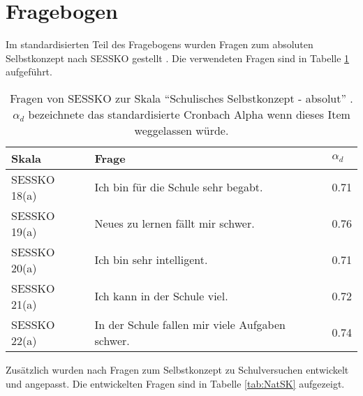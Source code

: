 \section{Fragebogen}

Im standardisierten Teil des Fragebogens wurden Fragen zum absoluten Selbstkonzept nach SESSKO gestellt \citep{Schone2002}. Die verwendeten Fragen sind in Tabelle \ref{tab:SESSKO} aufgeführt. 



\begin{table}[htbp]
  \centering
\begin{tabular}{|p{3cm}|p{9cm}|p{1cm}|}
\hline Skala & Frage & $\alpha_d$  \\ 
\hline SESSKO 18(a) & Ich bin für die Schule sehr begabt. &  0.71  \\ 
\hline SESSKO 19(a) & Neues zu lernen fällt mir schwer.  &  0.76 \\ 
\hline SESSKO 20(a) & Ich bin sehr intelligent. &  0.71  \\ 
\hline SESSKO 21(a) & Ich kann in der Schule viel. &  0.72   \\ 
\hline SESSKO 22(a) & In der Schule fallen mir viele Aufgaben schwer.  & 0.74   \\ 
\hline 
\end{tabular} 

  \caption{Fragen von SESSKO zur Skala "`Schulisches Selbstkonzept - absolut"'  \citep{Schone2002}. $\alpha_d$ bezeichnete das standardisierte Cronbach Alpha wenn dieses Item weggelassen würde.}
  \label{tab:SESSKO}
\end{table}

Zusätzlich wurden nach \citet{Dierks2014} Fragen zum Selbstkonzept zu Schulversuchen entwickelt und angepasst. Die entwickelten Fragen sind in Tabelle \ref{tab:NatSK} aufgezeigt.

